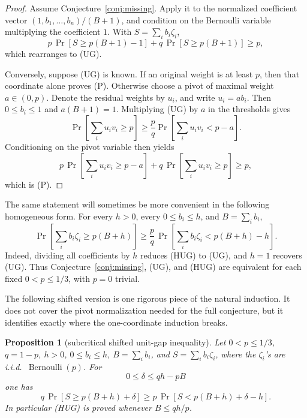 \documentclass[12pt]{article}
\newtheorem{proposition}{Proposition}
\newcommand{\Ber}{\operatorname{Bernoulli}}
\begin{document}
\begin{proof}
Assume Conjecture~\ref{conj:missing}.  Apply it to the normalized coefficient vector
\((1,b_1,\ldots,b_n)/(B+1)\), and condition on the
Bernoulli variable multiplying the coefficient \(1\).  With
\(S=\sum_i b_i\zeta_i\),
\[
 p\,\Pr[S\ge p(B+1)-1]+q\,\Pr[S\ge p(B+1)]\ge p,
\]
which rearranges to (UG).

Conversely, suppose (UG) is known.  If an original weight is at least \(p\),
then that coordinate alone proves (P).  Otherwise choose a pivot of maximal
weight \(a\in(0,p)\).  Denote the residual weights by \(u_i\), and write
\(u_i=a b_i\).  Then \(0\le b_i\le1\) and \(a(B+1)=1\).  Multiplying (UG) by \(a\) in the thresholds
gives
\[
 \Pr\!\left[\sum_i u_i v_i\ge p\right]
 \ge \frac pq
 \Pr\!\left[\sum_i u_i v_i<p-a\right].
\]
Conditioning on the pivot variable then yields
\[
 p\,\Pr\!\left[\sum_i u_i v_i\ge p-a\right]
 +q\,\Pr\!\left[\sum_i u_i v_i\ge p\right]\ge p,
\]
which is (P).
\end{proof}

The same statement will sometimes be more convenient in the following
homogeneous form.  For every \(h>0\), every \(0\le b_i\le h\), and
\(B=\sum_i b_i\),
\[
 \Pr\!\left[\sum_i b_i\zeta_i\ge p(B+h)\right]
 \ge
 \frac{p}{q}\,
 \Pr\!\left[\sum_i b_i\zeta_i<p(B+h)-h\right].            \tag{HUG}
\]
Indeed, dividing all coefficients by \(h\) reduces (HUG) to (UG), and \(h=1\)
recovers (UG).  Thus Conjecture~\ref{conj:missing}, (UG), and (HUG) are
equivalent for each fixed \(0<p\le1/3\), with \(p=0\) trivial.

The following shifted version is one rigorous piece of the natural induction.
It does not cover the pivot normalization needed for the full conjecture, but it
identifies exactly where the one-coordinate induction breaks.

\begin{proposition}[subcritical shifted unit-gap inequality]\label{prop:subcritical}
Let \(0<p\le1/3\), \(q=1-p\), \(h>0\), \(0\le b_i\le h\), \(B=\sum_i b_i\),
and \(S=\sum_i b_i\zeta_i\), where the \(\zeta_i\)'s are i.i.d.\ \(\Ber(p)\).
For
\[
        0\le \delta\le qh-pB
\]
one has
\[
 q\,\Pr\!\left[S\ge p(B+h)+\delta\right]
 \ge
 p\,\Pr\!\left[S<p(B+h)+\delta-h\right].                 \tag{6}
\]
In particular (HUG) is proved whenever \(B\le qh/p\).
\end{proposition}
\end{document}
